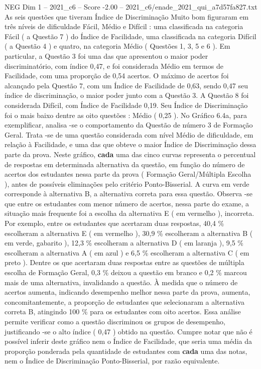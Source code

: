 \begin{textsample}{NEG Dim 1 – 2021\_c6 – Score -2.00 – 2021\_c6/enade\_2021\_qui\_a7d57fa827.txt}
As seis questões que tiveram Índice de Discriminação Muito bom figuraram em três níveis de dificuldade Fácil, Médio e Difícil : uma classificada na categoria Fácil ( a Questão 7 ) do Índice de Facilidade, uma classificada na categoria Difícil ( a Questão 4 ) e quatro, na categoria Médio ( Questões 1, 3, 5 e 6 ).
Em particular, a Questão 3 foi uma das que apresentou o maior poder discriminatório, com índice 0,47, e foi considerada Médio em termos de Facilidade, com uma proporção de 0,54 acertos.
O máximo de acertos foi alcançado pela Questão 7, com um Índice de Facilidade de 0,63, sendo 0,47 seu índice de discriminação, o maior poder junto com a Questão 3.
A Questão 8 foi considerada Difícil, com Índice de Facilidade 0,19.
Seu Índice de Discriminação foi o mais baixo dentre as oito questões : Médio ( 0,25 ).
No Gráfico 6.4a, para exemplificar, analisa -se o comportamento da Questão de número 3 de Formação Geral.
Trata -se de uma questão considerada com nível Médio de dificuldade, em relação à Facilidade, e uma das que obteve o maior Índice de Discriminação dessa parte da prova.
Neste gráfico, \textbf{cada} uma das cinco curvas representa o percentual de respostas em determinada alternativa da questão, em função do número de acertos dos estudantes nessa parte da prova ( Formação Geral/Múltipla Escolha ), antes de possíveis eliminações pelo critério Ponto-Bisserial.
A curva em verde corresponde à alternativa B, a alternativa correta para essa questão.
Observa -se que entre os estudantes com menor número de acertos, nessa parte do exame, a situação mais frequente foi a escolha da alternativa E ( em vermelho ), incorreta.
Por exemplo, entre os estudantes que acertaram duas respostas, 40,4 \% escolheram a alternativa E ( em vermelho ), 30,9 \% escolheram a alternativa B ( em verde, gabarito ), 12,3 \% escolheram a alternativa D ( em laranja ), 9,5 \% escolheram a alternativa A ( em azul ) e 6,5 \% escolheram a alternativa C ( em preto ).
Dentre os que acertaram duas respostas entre as questões de múltipla escolha de Formação Geral, 0,3 \% deixou a questão em branco e 0,2 \% marcou mais de uma alternativa, invalidando a questão.
À medida que o número de acertos aumenta, indicando desempenho melhor nessa parte da prova, aumenta, concomitantemente, a proporção de estudantes que selecionaram a alternativa correta B, atingindo 100 \% para os estudantes com oito acertos.
Essa análise permite verificar como a questão discriminou os grupos de desempenho, justificando -se o alto índice ( 0,47 ) obtido na questão.
Cumpre notar que não é possível inferir deste gráfico nem o Índice de Facilidade, que seria uma média da proporção ponderada pela quantidade de estudantes com \textbf{cada} uma das notas, nem o Índice de Discriminação Ponto-Bisserial, por razão equivalente.

\end{textsample}
